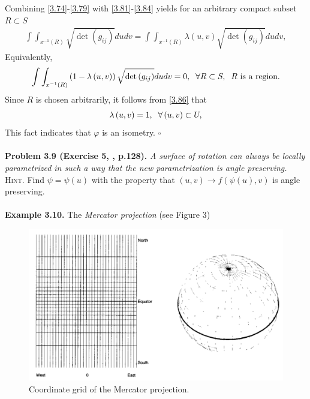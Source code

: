\documentclass[a4paper]{article}
\numberwithin{equation}{section}
\begin{document}
Combining \eqref{3.74}-\eqref{3.79} with \eqref{3.81}-\eqref{3.84}  yields for an arbitrary compact subset $R\subset S$
\begin{align}
\int {\int_{{x^{ - 1}}\left( R \right)} {\sqrt {\det \left( {{g_{ij}}} \right)} dudv} }  = \int {\int_{{x^{ - 1}}\left( R \right)} {\lambda \left( {u,v} \right)\sqrt {\det \left( {{g_{ij}}} \right)} dudv} } ,
\end{align}
Equivalently,
\begin{align}
\label{3.86}
\int {\int_{{x^{ - 1}}\left( R \right)} {\left( {1 - \lambda \left( {u,v} \right)} \right)\sqrt {\det \left( {{g_{ij}}} \right)} dudv} }  = 0,\hspace{0.2cm}\forall R \subset S,\hspace{0.2cm} R \mbox{ is a region}.
\end{align}
Since $R$ is chosen arbitrarily, it follows from \eqref{3.86} that
\begin{align}
\lambda \left( {u,v} \right) = 1,\hspace{0.2cm}\forall \left( {u,v} \right) \subset U,
\end{align}
This fact indicates that $\varphi$ is an isometry. \hfill $\square$\\
\\
\textbf{Problem 3.9 (Exercise 5, \cite{1}, p.128).} \textit{A surface of rotation can always be locally parametrized in such a way that the new parametrization is angle preserving.}\\
\textsc{Hint.} Find $\psi  = \psi \left( u \right)$  with the property that $\left(u,v\right)\to f\left(\psi \left(u\right),v\right)$ is angle preserving.\\
\\
\textbf{Example 3.10.} The \textit{Mercator projection} (see Figure 3)
\begin{figure}[H]
\label{1}
\includegraphics[scale=0.42]{1}
\caption{Coordinate grid of the Mercator projection.}
\end{figure}
\end{document}
